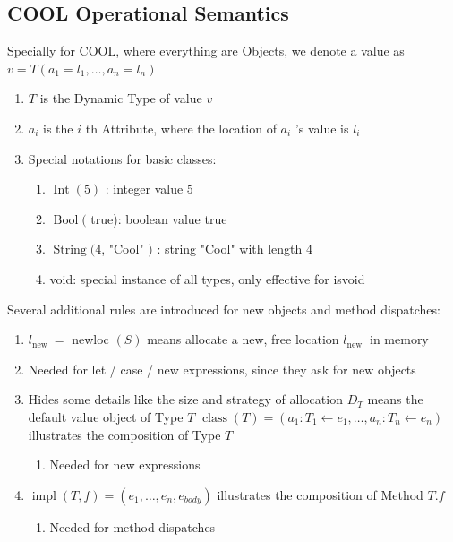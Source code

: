 \documentclass[a4paper]{exam}
\theoremstyle{definition}
\begin{document}
\subsection{COOL Operational Semantics}
Specially for COOL, where everything are Objects, we denote a value as $v=T\left(a_{1}=l_{1}, \ldots, a_{n}=l_{n}\right)$
\begin{enumerate}
    \item $T$ is the Dynamic Type of value $v$
\item $a_{i}$ is the $i$ th Attribute, where the location of $a_{i}$ 's value is $l_{i}$
\item Special notations for basic classes:
\begin{enumerate}
    \item $\operatorname{Int}(5)$ : integer value 5
\item $\operatorname{Bool}($ true): boolean value true
\item $\operatorname{String}(4$, "Cool" $)$ : string "Cool" with length 4
\item void: special instance of all types, only effective for isvoid
\end{enumerate}
\end{enumerate}
Several additional rules are introduced for new objects and method dispatches:
\begin{enumerate}
    \item $l_{\text {new }}=$ newloc $(S)$ means allocate a new, free location $l_{\text {new }}$ in memory
\item Needed for let / case / new expressions, since they ask for new objects
\item Hides some details like the size and strategy of allocation
$D_{T}$ means the default value object of Type $T$
$\operatorname{class}(T)=\left(a_{1}: T_{1} \leftarrow e_{1}, \ldots, a_{n}: T_{n} \leftarrow e_{n}\right)$ illustrates the composition of Type $T$
\begin{enumerate}
   \item Needed for new expressions
\end{enumerate}

\item $\operatorname{impl}(T, f)=\left(e_{1}, \ldots, e_{n}, e_{b o d y}\right)$ illustrates the composition of Method $T . f$
\begin{enumerate}
    \item Needed for method dispatches
\end{enumerate}

\end{enumerate}
\end{document}
